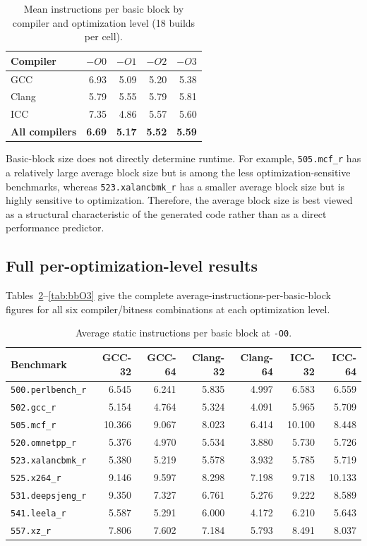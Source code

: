 \documentclass[11pt,a4paper]{article}
\newcommand{\bench}[1]{\texttt{#1}}
\begin{document}
\begin{table}[H]
\centering
\caption{Mean instructions per basic block by compiler and optimization level (18 builds per cell).}
\label{tab:bb_opt}
\begin{tabular}{lrrrr}
\toprule
Compiler & $-O0$ & $-O1$ & $-O2$ & $-O3$ \\
\midrule
GCC   & 6.93 & 5.09 & 5.20 & 5.38 \\
Clang & 5.79 & 5.55 & 5.79 & 5.81 \\
ICC   & 7.35 & 4.86 & 5.57 & 5.60 \\
\midrule
\textbf{All compilers} & \textbf{6.69} & \textbf{5.17} & \textbf{5.52} & \textbf{5.59} \\
\bottomrule
\end{tabular}
\end{table}

Basic-block size does not directly determine runtime. For example,
\bench{505.mcf\_r} has a relatively large average block size but is among the
less optimization-sensitive benchmarks, whereas
\bench{523.xalancbmk\_r} has a smaller average block size but is highly
sensitive to optimization. Therefore, the average block size is best viewed
as a structural characteristic of the generated code rather than as a direct
performance predictor.
 
\subsection{Full per-optimization-level results}
\label{sec:bb_full_tables}
 
Tables~\ref{tab:bbO0}--\ref{tab:bbO3} give the complete average-instructions-per-basic-block figures for all six compiler/bitness combinations at each optimization level.
 
\begin{table}[H]
\centering
\caption{Average static instructions per basic block at \texttt{-O0}.}
\label{tab:bbO0}
\begin{tabular}{lrrrrrr}
\toprule
Benchmark & GCC-32 & GCC-64 & Clang-32 & Clang-64 & ICC-32 & ICC-64 \\
\midrule
\bench{500.perlbench\_r} & 6.545 & 6.241 & 5.835 & 4.997 & 6.583 & 6.559 \\
\bench{502.gcc\_r} & 5.154 & 4.764 & 5.324 & 4.091 & 5.965 & 5.709 \\
\bench{505.mcf\_r} & 10.366 & 9.067 & 8.023 & 6.414 & 10.100 & 8.448 \\
\bench{520.omnetpp\_r} & 5.376 & 4.970 & 5.534 & 3.880 & 5.730 & 5.726 \\
\bench{523.xalancbmk\_r} & 5.380 & 5.219 & 5.578 & 3.932 & 5.785 & 5.719 \\
\bench{525.x264\_r} & 9.146 & 9.597 & 8.298 & 7.198 & 9.718 & 10.133 \\
\bench{531.deepsjeng\_r} & 9.350 & 7.327 & 6.761 & 5.276 & 9.222 & 8.589 \\
\bench{541.leela\_r} & 5.587 & 5.291 & 6.000 & 4.172 & 6.210 & 5.643 \\
\bench{557.xz\_r} & 7.806 & 7.602 & 7.184 & 5.793 & 8.491 & 8.037 \\
\bottomrule
\end{tabular}
\end{table}
 
\end{document}
